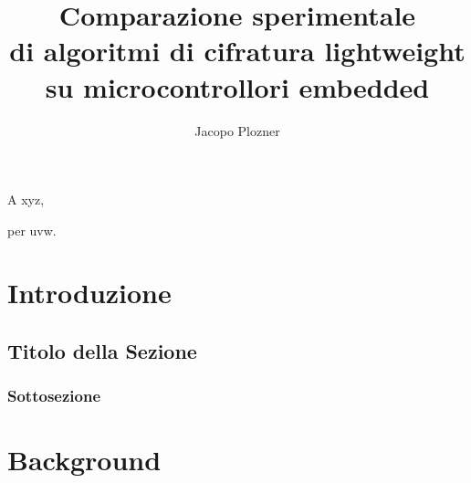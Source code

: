 \documentclass[target=bach,aauheader=,style=]{thud}
\title{Comparazione sperimentale \\ di algoritmi di cifratura lightweight \\ su microcontrollori embedded}
\author{Jacopo Plozner}
\begin{document}
\maketitle

\begin{dedication}
	A xyz,\par per uvw.
\end{dedication}

\acknowledgements


\abstract


\tableofcontents



\mainmatter


\chapter{Introduzione}

    \section{Titolo della Sezione}


    \subsection{Sottosezione}

\chapter{Background}
\end{document}
